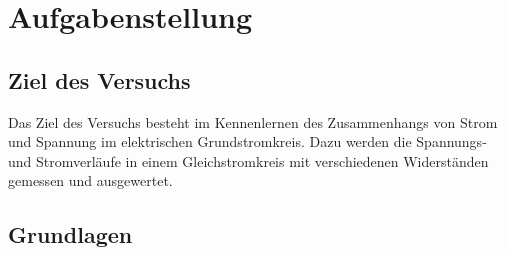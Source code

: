 \section{Aufgabenstellung}

\subsection{Ziel des Versuchs}
Das Ziel des Versuchs besteht im Kennenlernen des Zusammenhangs von Strom und Spannung im elektrischen Grundstromkreis. Dazu werden die Spannungs- und Stromverläufe in einem Gleichstromkreis mit verschiedenen Widerständen gemessen und ausgewertet.

\subsection{Grundlagen}